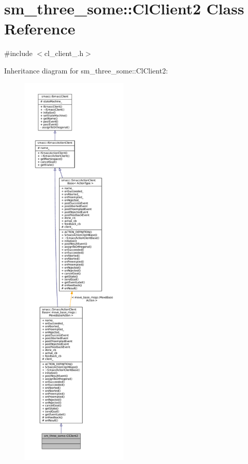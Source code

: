 \hypertarget{classsm__three__some_1_1ClClient2}{}\section{sm\+\_\+three\+\_\+some\+:\+:Cl\+Client2 Class Reference}
\label{classsm__three__some_1_1ClClient2}


{\ttfamily \#include $<$cl\+\_\+client\+\_.\+h$>$}



Inheritance diagram for sm\+\_\+three\+\_\+some\+:\+:Cl\+Client2\+:
\nopagebreak
\begin{figure}[H]
\begin{center}
\leavevmode
\includegraphics[height=550pt]{classsm__three__some_1_1ClClient2__inherit__graph}
\end{center}
\end{figure}


